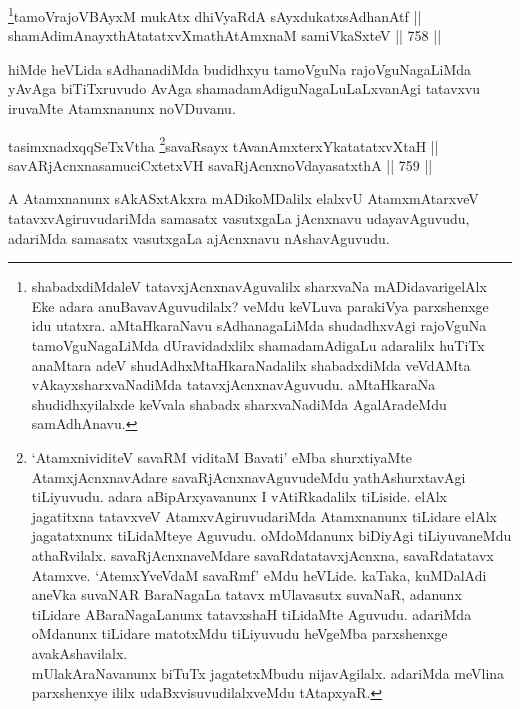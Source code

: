 \begin{shl}
\footnote{shabadxdiMdaleV tatavxjAcnxnavAguvalilx sharxvaNa 
mADidavarigelAlx Eke adara anuBavavAguvudilalx? veMdu keVLuva 
parakiVya parxshenxge idu utatxra. aMtaHkaraNavu sAdhanagaLiMda 
shudadhxvAgi rajoVguNa tamoVguNagaLiMda dUravidadxlilx shamadamAdigaLu 
adaralilx huTiTx anaMtara adeV shudAdhxMtaHkaraNadalilx shabadxdiMda 
veVdAMta vAkayxsharxvaNadiMda tatavxjAcnxnavAguvudu. aMtaHkaraNa 
shudidhxyilalxde keVvala shabadx sharxvaNadiMda AgalAradeMdu 
samAdhAnavu.}tamoVrajoVBAyxM mukAtx dhiVyaRdA sAyxdukatxsAdhanAtf || \\
shamAdimAnayxthAtatatxvXmathA\s \s tAmxnaM samiVkaSxteV \hfill || 758 ||  
\end{shl}

\begin{artha} 
hiMde heVLida sAdhanadiMda budidhxyu tamoVguNa rajoVguNagaLiMda yAvAga 
biTiTxruvudo AvAga shamadamAdiguNagaLuLaLxvanAgi tatavxvu iruvaMte 
Atamxnanunx noVDuvanu.
\end{artha}

\begin{shl}
tasimxnadxqqSeTxV\s tha \footnote{`AtamxnividiteV savaRM viditaM Bavati' eMba shurxtiyaMte 
AtamxjAcnxnavAdare savaRjAcnxnavAguvudeMdu yathAshurxtavAgi 
tiLiyuvudu. adara aBipArxyavanunx I vAtiRkadalilx tiLiside. elAlx 
jagatitxna tatavxveV AtamxvAgiruvudariMda Atamxnanunx tiLidare elAlx 
jagatatxnunx tiLidaMteye Aguvudu. oMdoMdanunx biDiyAgi tiLiyuvaneMdu 
athaRvilalx. savaRjAcnxnaveMdare savaRdatatavxjAcnxna, savaRdatatavx 
Atamxve. `AtemxYveVdaM savaRmf' eMdu heVLide. kaTaka, kuMDalAdi aneVka 
suvaNAR BaraNagaLa tatavx mUlavasutx suvaNaR, adanunx tiLidare 
ABaraNagaLanunx tatavxshaH tiLidaMte Aguvudu. adariMda oMdanunx 
tiLidare matotxMdu tiLiyuvudu heVgeMba parxshenxge avakAshavilalx.\\
mUlakAraNavanunx biTuTx jagatetxMbudu nijavAgilalx. adariMda meVlina 
parxshenxye ililx udaBxvisuvudilalxveMdu tAtapxyaR.}savaRsayx tAvanAmxterxYkatatatxvXtaH || \\
savARjAcnxnasamuciCxtetxVH savaRjAcnxnoVdayasatxthA \hfill || 759 ||  
\end{shl}

\begin{artha} 
A Atamxnanunx sAkASxtAkxra mADikoMDalilx elalxvU AtamxmAtarxveV 
tatavxvAgiruvudariMda samasatx vasutxgaLa jAcnxnavu udayavAguvudu, 
adariMda samasatx vasutxgaLa ajAcnxnavu nAshavAguvudu.
\end{artha}

